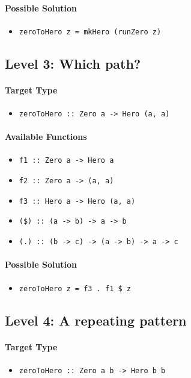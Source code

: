 \documentclass[preprint,12pt]{elsarticle}
\begin{document}
\paragraph{Possible Solution} 
\begin{itemize}
    \item \texttt{zeroToHero z = mkHero (runZero z)}
\end{itemize}

\subsection{Level 3: Which path?}
\paragraph{Target Type } 
\begin{itemize}
    \item \texttt{zeroToHero :: Zero a -> Hero (a, a)}
\end{itemize}

\paragraph{Available Functions} 
\begin{itemize}
    \item \texttt{f1 :: Zero a -> Hero a}
    \item \texttt{f2 :: Zero a -> (a, a)}
    \item \texttt{f3 :: Hero a -> Hero (a, a)}
    \item \texttt{(\$) :: (a -> b) -> a -> b}
    \item \texttt{(.) :: (b -> c) -> (a -> b) -> a -> c}
\end{itemize}

\paragraph{Possible Solution} 
\begin{itemize}
    \item \texttt{zeroToHero z = f3 . f1 \$ z}
\end{itemize}


\subsection{Level 4: A repeating pattern}
\paragraph{Target Type } 
\begin{itemize}
    \item \texttt{zeroToHero :: Zero a b -> Hero b b}
\end{itemize}
\end{document}
